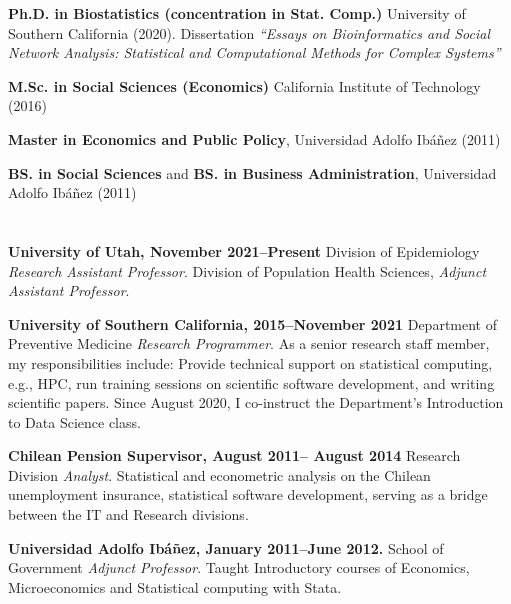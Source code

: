 \documentclass[letterpaper, 10pt]{article}
\newcommand{\myorange}{myteal!70!black}
\newcommand{\darkorange}{\myorange !50!black}
\renewcommand{\bf}{\bfseries\color{\myorange}}
\renewcommand{\textbf}[1]{{\bfseries\color{\myorange}#1}}
\renewenvironment{itemize}{
  \begin{list}{}{
    \setlength{\leftmargin}{0.3cm}
  }
}{
  \end{list}
}
\begin{document}
\begin{itemize}
\item 
{\bf Ph.D. in Biostatistics (concentration in Stat. Comp.)} University of Southern California (2020). Dissertation \emph{``Essays on Bioinformatics and Social Network Analysis: Statistical and Computational Methods for Complex Systems''}

{\bf M.Sc. in Social Sciences (Economics)} California Institute of Technology (2016)

{\bf Master in Economics and Public Policy}, Universidad Adolfo Ib\'a\~nez (2011)

{\bf BS. in Social Sciences} and {\bf BS. in Business Administration}, Universidad Adolfo Ib\'a\~nez (2011)
\end{itemize}



\section*{\color{\darkorange}{Professional Experience}}
\vspace{-.25cm}

\begin{itemize}
\item \textbf{University of Utah, November 2021--Present} Division of Epidemiology \emph{Research Assistant Professor}. Division of Population Health Sciences, \emph{Adjunct Assistant Professor}.
\item \textbf{University of Southern California, 2015--November 2021} Department of Preventive Medicine \emph{Research Programmer}. As a senior research staff member, my responsibilities include: Provide technical support on statistical computing, e.g., HPC, run training sessions on scientific software development, and writing scientific papers. Since August 2020, I co-instruct the Department's Introduction to Data Science class.
\item \textbf{Chilean Pension Supervisor, August 2011-- August 2014} Research Division \emph{Analyst}. Statistical and econometric analysis on the Chilean unemployment insurance, statistical software development, serving as a bridge between the IT and Research divisions.
\item \textbf{Universidad Adolfo Ib\'a\~nez, January 2011--June 2012.} School of Government \emph{Adjunct Professor}.
Taught Introductory courses of Economics, Microeconomics and Statistical computing with Stata.
\end{itemize}
\end{document}
